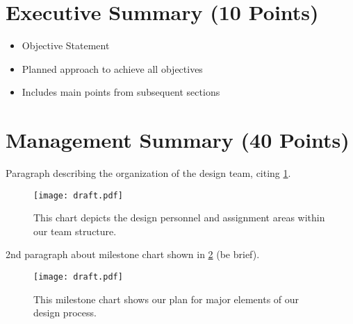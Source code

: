 \documentclass[proposal]{byu-aero}
\begin{document}
\section{Executive Summary (10 Points)}
\label{sec:ExecutiveSummary}
\begin{itemize}
    \item Objective Statement
    \item Planned approach to achieve all objectives
    \item Includes main points from subsequent sections
\end{itemize}


\section{Management Summary (40 Points)}
\label{sec:ManagementSummary}

Paragraph describing the organization of the design team, citing \cref{fig:personnelassignments}.

\begin{figure}[h!]
	\centering
	\texttt{[image: draft.pdf]}
	\caption{This chart depicts the design personnel and assignment areas within our team structure.}
	\label{fig:personnelassignments}
\end{figure}

2nd paragraph about milestone chart shown in  \cref{fig:plannedvsactualtiming} (be brief).

\begin{figure}[h!]
	\centering
	\texttt{[image: draft.pdf]}
	\caption{This milestone chart shows our plan for major elements of our design process.}
	\label{fig:plannedvsactualtiming}
\end{figure}
\end{document}
